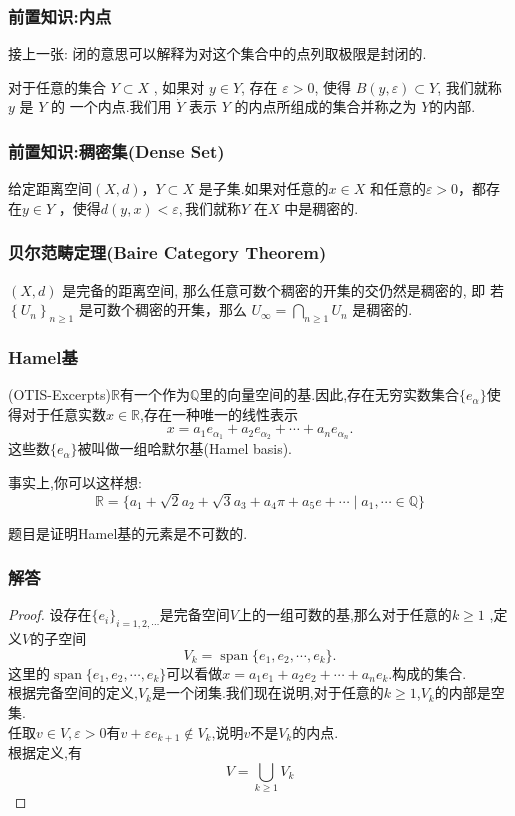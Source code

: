 \documentclass[12pt,aspectratio=169,mathserif]{beamer}
\begin{document}
\begin{frame}
	\frametitle{前置知识:内点}
		接上一张: 闭的意思可以解释为对这个集合中的点列取极限是封闭的.\pause
		
	\begin{definition}[内点]
		 对于任意的集合  $Y \subset X$ , 如果对  $y \in Y $, 存在  $\varepsilon>0 $, 使得 $ B(y, \varepsilon) \subset Y $, 我们就称 $ y $ 是  $Y$  的 一个内点.我们用  $\dot{Y} $ 表示 $ Y $ 的内点所组成的集合并称之为 $ Y  $的内部.
	\end{definition}
\end{frame}
\begin{frame}
	\frametitle{前置知识:稠密集(Dense Set)}
	\begin{definition}
		给定距离空间$(X, d)$，$Y \subset X$ 是子集.如果对任意的$x\in X$ 和任意的$\varepsilon > 0$，都存
		在$y \in Y$ ，使得$d(y,x) < \varepsilon,$我们就称$Y$ 在$X$ 中是稠密的.
	\end{definition}
\end{frame}
\begin{frame}
	\frametitle{贝尔范畴定理(Baire Category Theorem)}
	\begin{theorem}[Baire]
	$	(X, d)$  是完备的距离空间, 那么任意可数个稠密的开集的交仍然是稠密的, 即 若  $\left\{U_{n}\right\}_{n \geqslant 1}$  是可数个稠密的开集，那么 $ U_{\infty}=\bigcap_{n \geqslant 1} U_{n} $ 是稠密的.
	\end{theorem}
\end{frame}
\begin{frame}
	\frametitle{Hamel基}
	\begin{definition}[Hamel]
		(OTIS-Excerpts)$\mathbb{R}$有一个作为$\mathbb{Q}$里的向量空间的基.因此,存在无穷实数集合$\{e_\alpha\}$使得对于任意实数$x\in \mathbb{R}$,存在一种唯一的线性表示$$x=a_1e_{\alpha_1}+a_2e_{\alpha_2}+\cdots+a_ne_{\alpha_n}.$$
		这些数$\{e_{\alpha}\}$被叫做一组哈默尔基(Hamel basis).
		
		事实上,你可以这样想:$$
		\mathbb{R}=\{a_1+\sqrt{2}a_2+\sqrt{3}a_3+a_4\pi+a_5e+\cdots\mid a_1,\cdots \in \mathbb{Q}\}
		$$
	\end{definition}
	\pause
	题目是证明Hamel基的元素是不可数的.
\end{frame}
\begin{frame}
	\frametitle{解答}
	\begin{proof}
		设存在$\{e_i\}_{i=1,2,\cdots}$是完备空间$V$上的一组可数的基,那么对于任意的$k\ge1$ ,定义$V$的子空间$$
		V_k = \operatorname{span}\{e_1,e_2,\cdots,e_k\}.$$
		这里的$\operatorname{span}\{e_1,e_2,\cdots,e_k\}$可以看做$x=a_1e_{1}+a_2e_{2}+\cdots+a_ne_{k}.$构成的集合.
		\pause
		\\根据完备空间的定义,$V_k$是一个闭集.\pause 我们现在说明,对于任意的$k\ge1$,$V_k$的内部是空集.\pause \\
		任取$v\in V,\varepsilon>0$有$v+\varepsilon e_{k+1}\notin V_k$,说明$v$不是$V_k$的内点.\pause\\
		根据定义,有$$
		V=\bigcup_{k \geqslant 1} V_{k} $$
	\end{proof}

\end{frame}
\end{document}
